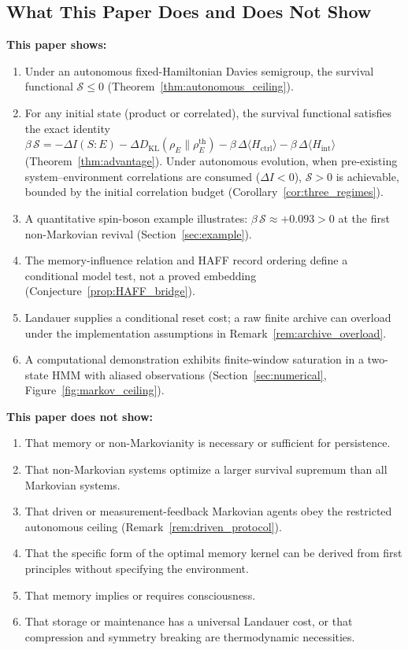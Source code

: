 \documentclass[12pt]{article}
\begin{document}
\subsection{What This Paper Does and Does Not Show}

\textbf{This paper shows:}
\begin{enumerate}
\item Under an autonomous fixed-Hamiltonian Davies semigroup,
  the survival functional $\mathcal{S} \leq 0$
  (Theorem~\ref{thm:autonomous_ceiling}).
\item For any initial state (product or correlated), the
  survival functional satisfies the exact identity
  $\beta\,\mathcal{S} = -\Delta I(S{:}E)
  - \Delta D_{\mathrm{KL}}(\rho_E \| \rho_E^{\mathrm{th}})
  - \beta\,\Delta\langle H_{\mathrm{ctrl}}\rangle
  - \beta\,\Delta\langle H_{\mathrm{int}}\rangle$
  (Theorem~\ref{thm:advantage}).
  Under autonomous evolution, when pre-existing
  system--environment correlations are consumed
  ($\Delta I < 0$), $\mathcal{S} > 0$ is achievable,
  bounded by the initial correlation budget
  (Corollary~\ref{cor:three_regimes}).
\item A quantitative spin-boson example illustrates:
  $\beta\,\mathcal{S} \approx +0.093 > 0$ at the first
  non-Markovian revival (Section~\ref{sec:example}).
\item The memory-influence relation and HAFF record ordering define a
  conditional model test, not a proved embedding
  (Conjecture~\ref{prop:HAFF_bridge}).
\item Landauer supplies a conditional reset cost; a raw finite archive
  can overload under the implementation assumptions in
  Remark~\ref{rem:archive_overload}.
\item A computational demonstration exhibits finite-window saturation
  in a two-state HMM with aliased observations
  (Section~\ref{sec:numerical},
  Figure~\ref{fig:markov_ceiling}).
\end{enumerate}

\textbf{This paper does not show:}
\begin{enumerate}
\item That memory or non-Markovianity is necessary or sufficient for
  persistence.
\item That non-Markovian systems optimize a larger survival supremum
  than all Markovian systems.
\item That driven or measurement-feedback Markovian agents obey the
  restricted autonomous ceiling (Remark~\ref{rem:driven_protocol}).
\item That the specific form of the optimal memory kernel can be
  derived from first principles without specifying the
  environment.
\item That memory implies or requires consciousness.
\item That storage or maintenance has a universal Landauer cost, or
  that compression and symmetry breaking are thermodynamic necessities.
\end{enumerate}
\end{document}
